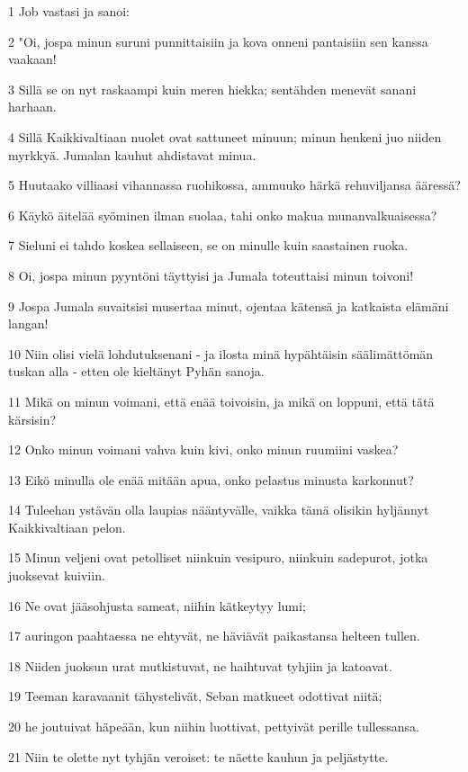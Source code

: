 \par 1 Job vastasi ja sanoi:
\par 2 "Oi, jospa minun suruni punnittaisiin ja kova onneni pantaisiin sen kanssa vaakaan!
\par 3 Sillä se on nyt raskaampi kuin meren hiekka; sentähden menevät sanani harhaan.
\par 4 Sillä Kaikkivaltiaan nuolet ovat sattuneet minuun; minun henkeni juo niiden myrkkyä. Jumalan kauhut ahdistavat minua.
\par 5 Huutaako villiaasi vihannassa ruohikossa, ammuuko härkä rehuviljansa ääressä?
\par 6 Käykö äitelää syöminen ilman suolaa, tahi onko makua munanvalkuaisessa?
\par 7 Sieluni ei tahdo koskea sellaiseen, se on minulle kuin saastainen ruoka.
\par 8 Oi, jospa minun pyyntöni täyttyisi ja Jumala toteuttaisi minun toivoni!
\par 9 Jospa Jumala suvaitsisi musertaa minut, ojentaa kätensä ja katkaista elämäni langan!
\par 10 Niin olisi vielä lohdutuksenani - ja ilosta minä hypähtäisin säälimättömän tuskan alla - etten ole kieltänyt Pyhän sanoja.
\par 11 Mikä on minun voimani, että enää toivoisin, ja mikä on loppuni, että tätä kärsisin?
\par 12 Onko minun voimani vahva kuin kivi, onko minun ruumiini vaskea?
\par 13 Eikö minulla ole enää mitään apua, onko pelastus minusta karkonnut?
\par 14 Tuleehan ystävän olla laupias nääntyvälle, vaikka tämä olisikin hyljännyt Kaikkivaltiaan pelon.
\par 15 Minun veljeni ovat petolliset niinkuin vesipuro, niinkuin sadepurot, jotka juoksevat kuiviin.
\par 16 Ne ovat jääsohjusta sameat, niihin kätkeytyy lumi;
\par 17 auringon paahtaessa ne ehtyvät, ne häviävät paikastansa helteen tullen.
\par 18 Niiden juoksun urat mutkistuvat, ne haihtuvat tyhjiin ja katoavat.
\par 19 Teeman karavaanit tähystelivät, Seban matkueet odottivat niitä;
\par 20 he joutuivat häpeään, kun niihin luottivat, pettyivät perille tullessansa.
\par 21 Niin te olette nyt tyhjän veroiset: te näette kauhun ja peljästytte.

